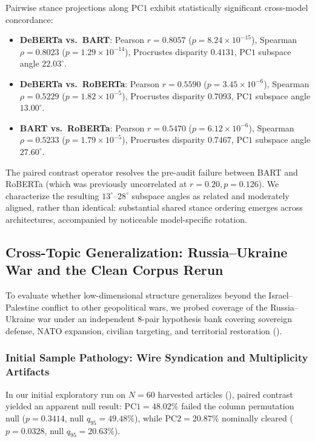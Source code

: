 Pairwise stance projections along $\mathrm{PC1}$ exhibit statistically significant cross-model concordance:
\begin{itemize}
    \item \textbf{DeBERTa vs.\ BART}: Pearson $r = \mathbf{0.8057}$ ($p = 8.24 \times 10^{-15}$), Spearman $\rho = 0.8023$ ($p = 1.29 \times 10^{-14}$), Procrustes disparity $0.4131$, $\mathrm{PC1}$ subspace angle $22.03^\circ$.
    \item \textbf{DeBERTa vs.\ RoBERTa}: Pearson $r = \mathbf{0.5590}$ ($p = 3.45 \times 10^{-6}$), Spearman $\rho = 0.5229$ ($p = 1.82 \times 10^{-5}$), Procrustes disparity $0.7093$, $\mathrm{PC1}$ subspace angle $13.00^\circ$.
    \item \textbf{BART vs.\ RoBERTa}: Pearson $r = \mathbf{0.5470}$ ($p = 6.12 \times 10^{-6}$), Spearman $\rho = 0.5233$ ($p = 1.79 \times 10^{-5}$), Procrustes disparity $0.7467$, $\mathrm{PC1}$ subspace angle $27.60^\circ$.
\end{itemize}
The paired contrast operator resolves the pre-audit failure between BART and RoBERTa (which was previously uncorrelated at $r = 0.20, p = 0.126$). We characterize the resulting $13^\circ$--$28^\circ$ subspace angles as related and moderately aligned, rather than identical: substantial shared stance ordering emerges across architectures, accompanied by noticeable model-specific rotation.

\subsection{Cross-Topic Generalization: Russia--Ukraine War and the Clean Corpus Rerun}
\label{sec:ukraine_cross_topic_results}

To evaluate whether low-dimensional structure generalizes beyond the Israel--Palestine conflict to other geopolitical wars, we probed coverage of the Russia--Ukraine war under an independent 8-pair hypothesis bank covering sovereign defense, NATO expansion, civilian targeting, and territorial restoration ().

\subsubsection{Initial Sample Pathology: Wire Syndication and Multiplicity Artifacts}
In our initial exploratory run on $N=60$ harvested articles (), paired contrast yielded an apparent null result: $\mathrm{PC1} = 48.02\%$ failed the column permutation null ($p = 0.3414$, null $q_{95} = 49.48\%$), while $\mathrm{PC2} = 20.87\%$ nominally cleared ($p = 0.0328$, null $q_{95} = 20.63\%$).

